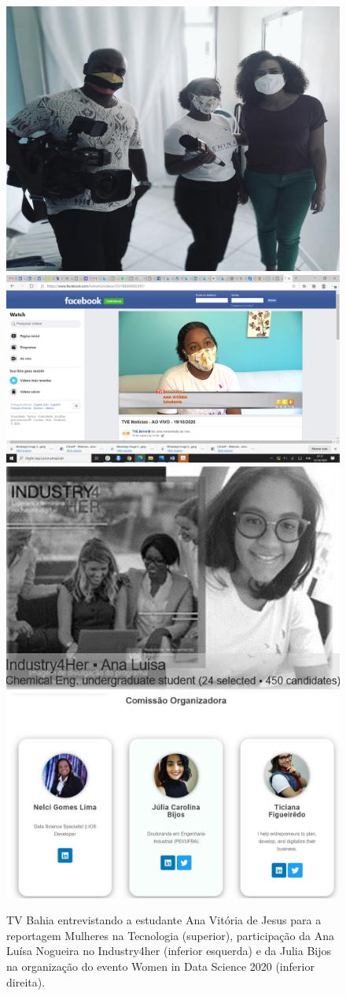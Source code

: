 \documentclass[
]{book}
\begin{document}
\begin{figure}

{\centering \includegraphics[width=0.49\linewidth,height=0.2\textheight]{images/image124} \includegraphics[width=0.49\linewidth,height=0.2\textheight]{images/image36} \includegraphics[width=0.49\linewidth,height=0.2\textheight]{images/image37} \includegraphics[width=0.49\linewidth,height=0.2\textheight]{images/image38} 

}

\caption{TV Bahia entrevistando a estudante Ana Vitória de Jesus para a reportagem Mulheres na Tecnologia (superior), participação da Ana Luísa Nogueira no Industry4her (inferior esquerda) e da Julia Bijos na organização do evento Women in Data Science 2020 (inferior direita).}\label{fig:transmosaic}
\end{figure}
\end{document}
